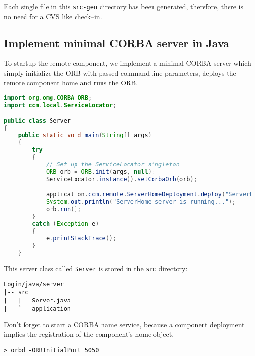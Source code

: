 Each single file in this {\tt src-gen} directory has been generated, therefore, 
there is no need for a CVS like check--in.


\subsection{Implement minimal CORBA server in Java}
\label{subsection:ImplementMinimalCorbaServerJava}

To startup the remote component, we implement a minimal CORBA server which
simply initialize the ORB with passed command line parameters, deploys the remote
component home and runs the ORB.

\begin{footnotesize}
\begin{lstlisting}[language=Java]
import org.omg.CORBA.ORB;
import ccm.local.ServiceLocator;

public class Server
{
    public static void main(String[] args)
    {
        try
        {
            // Set up the ServiceLocator singleton
            ORB orb = ORB.init(args, null);
            ServiceLocator.instance().setCorbaOrb(orb);

            application.ccm.remote.ServerHomeDeployment.deploy("ServerHome");
            System.out.println("ServerHome server is running...");
            orb.run();
        }
        catch (Exception e)
        {
            e.printStackTrace();
        }
    }
\end{lstlisting}
\end{footnotesize}

This server class called {\tt Server} is stored in the {\tt src} directory:
\begin{footnotesize}
\begin{verbatim}
Login/java/server
|-- src
|   |-- Server.java
|   `-- application
\end{verbatim}
\end{footnotesize}

Don't forget to start a CORBA name service, because a component deployment
implies the registration of the component's home object.
\begin{footnotesize}
\begin{verbatim}
> orbd -ORBInitialPort 5050
\end{verbatim}
\end{footnotesize}

